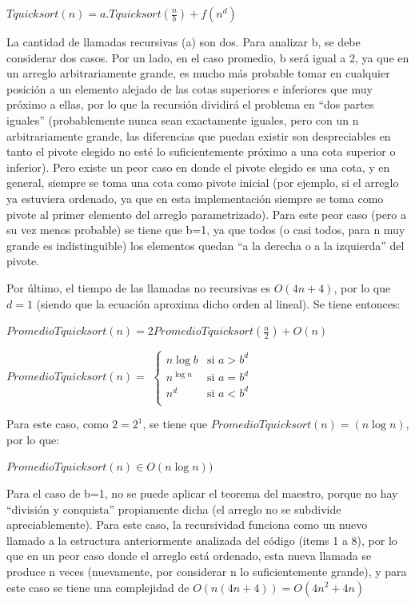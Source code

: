 \documentclass[titlepage,a4paper]{article}
\begin{document}
$Tquicksort(n) = a.Tquicksort(\frac{n}{b}) + f(n^d)$

La cantidad de llamadas recursivas (a) son dos. Para analizar b, se debe considerar dos casos. Por un lado, en el caso promedio, b será igual a 2, ya que en un arreglo arbitrariamente grande, es mucho más probable tomar en cualquier posición a un elemento alejado de las cotas superiores e inferiores que muy próximo a ellas, por lo que la recursión dividirá el problema en “dos partes iguales” (probablemente nunca sean exactamente iguales, pero con un n arbitrariamente grande, las diferencias que puedan existir son despreciables en tanto el pivote elegido no esté lo suficientemente próximo a una cota superior o inferior). Pero existe un peor caso en donde el pivote elegido es una cota, y en general, siempre se toma una cota como pivote inicial (por ejemplo, si el arreglo ya estuviera ordenado, ya que en esta implementación siempre se toma como pivote al primer elemento del arreglo parametrizado). Para este peor caso (pero a su vez menos probable) se tiene que b=1, ya que todos (o casi todos, para n muy grande es indistinguible) los elementos quedan “a la derecha o a la izquierda” del pivote. 

Por último, el tiempo de las llamadas no recursivas es $O(4n + 4)$, por lo que $d=1$ (siendo que la ecuación aproxima dicho orden al lineal). Se tiene entonces:

$PromedioTquicksort(n) = 2PromedioTquicksort(\frac{n}{2}) + O(n)$


$PromedioTquicksort(n) = $ $\begin{cases}
  n \log b  & \text{si }a > b^d\\    
  n^{\log n} & \text{si }a = b^d\\    
  n^d & \text{si }a < b^d\\    
\end{cases}$

Para este caso, como $2 = 2^1$, se tiene que $PromedioTquicksort(n) = (n \log n)$, por lo que:

$PromedioTquicksort(n) \in O(n \log n))$

Para el caso de b=1, no se puede aplicar el teorema del maestro, porque no hay “división y conquista” propiamente dicha (el arreglo no se subdivide apreciablemente). Para este caso, la recursividad funciona como un nuevo llamado a la estructura anteriormente analizada del código (items 1 a 8), por lo que en un peor caso donde el arreglo está ordenado, esta nueva llamada se produce n veces (nuevamente, por considerar n lo suficientemente grande), y para este caso se tiene una complejidad de $O( n(4n + 4) ) =  O( 4n^2 + 4n)$
\end{document}
